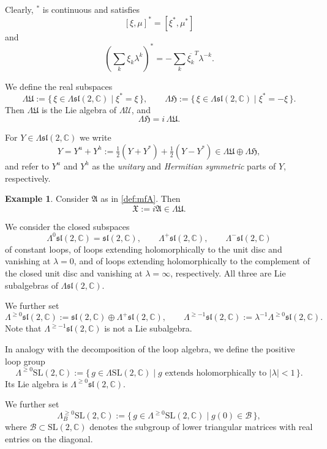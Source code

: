 \documentclass[12pt,a4paper]{amsart}
\theoremstyle{definition}
\newtheorem{example}[theorem]{Example}
\theoremstyle{remark}
\newcommand{\C}{\mathbb C}
\begin{document}
Clearly, $^*$ is continuous and satisfies
\begin{equation}\label{eq:real_invol} [\xi,\mu]^*=[\xi^*,\mu^*]\end{equation}
and
\[(\sum_k \xi_k\lambda^k)^*=-\sum_k \overline{\xi_{k}}^T \lambda^{-k}.\]

We define the real subspaces
\[
\Lambda\mathfrak U
:=
\{\,\xi\in \Lambda\mathfrak{sl}(2,\C)\mid \xi^*=\xi\,\},
\qquad
\Lambda\mathfrak H
:=
\{\,\xi\in \Lambda\mathfrak{sl}(2,\C)\mid \xi^*=-\xi\,\}.
\]
Then $\Lambda\mathfrak U$ is the Lie algebra of $\Lambda\mathcal U$, and
\[
\Lambda\mathfrak H = i\,\Lambda\mathfrak U.
\]

For $Y\in \Lambda\mathfrak{sl}(2,\C)$ we write
\begin{equation}\label{defuhdeco}
Y
=
Y^{u}+Y^{h}
:=
\tfrac{1}{2}(Y+Y^*)+\tfrac{1}{2}(Y-Y^*)
\in
\Lambda\mathfrak U\oplus\Lambda\mathfrak H,
\end{equation}
and refer to $Y^{u}$ and $Y^{h}$ as the \emph{unitary} and
\emph{Hermitian symmetric} parts of $Y$, respectively.
\begin{example}
Consider $\mathfrak A$ as in \eqref{def:mfA}. Then
\begin{equation}\label{eq:defX}\mathfrak X:=i\mathfrak A\in\Lambda\mathfrak U.\end{equation}
\end{example}

We consider the closed subspaces
\[
\Lambda^0\mathfrak{sl}(2,\C)=\mathfrak{sl}(2,\C),\qquad
\Lambda^+\mathfrak{sl}(2,\C),\qquad
\Lambda^-\mathfrak{sl}(2,\C)
\]
of constant loops, of loops extending holomorphically to the unit disc and vanishing
at $\lambda=0$, and of loops extending holomorphically to the complement of the closed
unit disc and vanishing at $\lambda=\infty$, respectively.
All three are Lie subalgebras of $\Lambda\mathfrak{sl}(2,\C)$.

We further set
\[
\Lambda^{\ge 0}\mathfrak{sl}(2,\C)
:=
\mathfrak{sl}(2,\C)\oplus \Lambda^+\mathfrak{sl}(2,\C),
\qquad
\Lambda^{\ge -1}\mathfrak{sl}(2,\C)
:=
\lambda^{-1}\Lambda^{\ge 0}\mathfrak{sl}(2,\C).
\]
Note that $\Lambda^{\ge -1}\mathfrak{sl}(2,\C)$ is not a Lie subalgebra.


In analogy with the decomposition of the loop algebra, we define the positive loop group
\[
\Lambda^{\geq0}\mathrm{SL}(2,\C)
:=
\{\, g\in \Lambda\mathrm{SL}(2,\C)
\mid g \text{ extends holomorphically to } |\lambda|<1 \,\}.
\]
Its Lie algebra is $\Lambda^{\ge 0}\mathfrak{sl}(2,\C)$.

We further set
\[
\Lambda^{\geq0}_{B}\mathrm{SL}(2,\C)
:=
\{\, g\in \Lambda^{\geq0}\mathrm{SL}(2,\C)
\mid g(0)\in \mathcal B \,\},
\]
where $\mathcal B\subset \mathrm{SL}(2,\C)$ denotes the subgroup of lower triangular
matrices with real entries on the diagonal.
\end{document}
